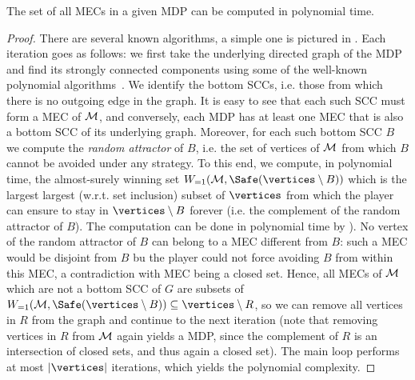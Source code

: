 \begin{theorem}
\label{5-thm:MEC-decomposition-complexity}
The set of all MECs in a given MDP can be computed in polynomial time.
\end{theorem}
\begin{proof}
There are several known algorithms, a simple one is pictured in . Each iteration goes as follows: we first take the underlying directed graph of the MDP and find its strongly connected components using some of the well-known polynomial algorithms~\cite{Cormen&Leiserson&Rivest&Stein:2009}. We identify the bottom SCCs, i.e. those from which there is no outgoing edge in the graph. It is easy to see that each such SCC must form a MEC of $\mathcal{M}$, and conversely, each MDP has at least one MEC that is also a bottom SCC of its underlying graph. Moreover, for each such bottom SCC $B $ we compute the \emph{random attractor} of $B$, i.e. the set of vertices of $\mathcal{M}$ from which $B$ cannot be avoided under any strategy. To this end, we compute, in polynomial time, the almost-surely winning set $ \winAS(\mdp,\Safe(\vertices \setminus B)) $ which is the largest largest (w.r.t. set inclusion) subset of $\vertices$ from which the player can ensure to stay in $\vertices \setminus B$ forever (i.e. the complement of the random attractor of $B$). The computation can be done in polynomial time by ). No vertex of the random attractor of $B$ can belong to a MEC different from $ B $: such a MEC would be disjoint from $ B $ bu the player could not force avoiding $ B $ from within this MEC, a contradiction with MEC being a closed set. Hence, all MECs of $\mathcal{M}$ which are not a bottom SCC of $G$ are subsets of $\winAS(\mdp,\Safe(\vertices \setminus B)) \subseteq \vertices \setminus R$, so we can remove all vertices in $R$ from the graph and continue to the next iteration (note that removing vertices in $R$ from $\mathcal{M}$ again yields a MDP, since the complement of $R$ is an intersection of closed sets, and thus again a closed set). The main loop performs at most $|\vertices|$ iterations, which yields the polynomial complexity.
\end{proof}
